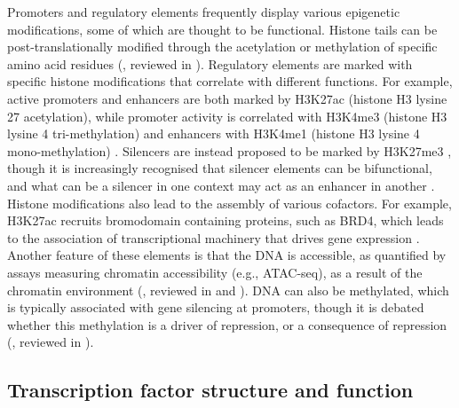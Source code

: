 Promoters and regulatory elements frequently display various epigenetic modifications, some of which are thought to be functional. Histone tails can be post-translationally modified through the acetylation or methylation of specific amino acid residues (\cite{luger_histone_1998}, reviewed in \cite{bannister_regulation_2011}). Regulatory elements are marked with specific histone modifications that correlate with different functions. For example, active promoters and enhancers are both marked by H3K27ac (histone H3 lysine 27 acetylation), while promoter activity is correlated with H3K4me3 (histone H3 lysine 4 tri-methylation) and enhancers with H3K4me1 (histone H3 lysine 4 mono-methylation) \citep{heintzman_histone_2009, heintzman_distinct_2007, creyghton_histone_2010, barski_high-resolution_2007}. Silencers are instead proposed to be marked by H3K27me3 \citep{huang_identification_2019}, though it is increasingly recognised that silencer elements can be bifunctional, and what can be a silencer in one context may act as an enhancer in another \citep{brand_yeast_1987}. Histone modifications also lead to the assembly of various cofactors. For example, H3K27ac recruits bromodomain containing proteins, such as BRD4, which leads to the association of transcriptional machinery that drives gene expression \citep{dhalluin_structure_1999, yang_recruitment_2005, jang_bromodomain_2005}. Another feature of these elements is that the DNA is accessible, as quantified by assays measuring chromatin accessibility (e.g., ATAC-seq), as a result of the chromatin environment (\cite{theisen_lysozyme_1986, baniahmad_activity_1987, parslow_structure_1983}, reviewed in \cite{gross_nuclease_1988} and \cite{klemm_chromatin_2019}). DNA can also be methylated, which is typically associated with gene silencing at promoters, though it is debated whether this methylation is a driver of repression, or a consequence of repression (\cite{hashimshony_role_2003, venolia_comparison_1983, lock_methylation_1987}, reviewed in \cite{jones_functions_2012}). 

\subsection{\label{ch1:tf-structure-function}Transcription factor structure and function}

